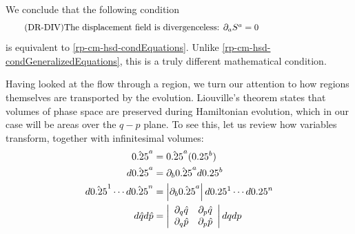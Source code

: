 We conclude that the following condition
\begin{equation}\label{rp-cm-hsd-condDivergenceDisplacement}
	\tag{DR-DIV}
	\eqtext{The displacement field is divergenceless: $\partial_a S^a = 0$} 
\end{equation}
is equivalent to \ref{rp-cm-hsd-condEquations}. Unlike \ref{rp-cm-hsd-condGeneralizedEquations}, this is a truly different mathematical condition.

Having looked at the flow through a region, we turn our attention to how regions themselves are transported by the evolution. Liouville's theorem states that volumes of phase space are preserved during Hamiltonian evolution, which in our case will be areas over the $q-p$ plane. To see this, let us review how variables transform, together with infinitesimal volumes:
\begin{equation}\label{rp-cm-volumeTransformation1d}
	\begin{aligned}
		\hat{\xi}^a &= \hat{\xi}^a(\xi^b) \\
		d\hat{\xi}^a &= \partial_b \hat{\xi}^a d\xi^b \\
		d\hat{\xi}^1 \cdots d\hat{\xi}^n &= \left| \partial_b \hat{\xi}^a \right| d\xi^1 \cdots d\xi^n \\
		d\hat{q} d\hat{p} &= \left|\begin{array}{ c c }
			\partial_q \hat{q} & \partial_p \hat{q} \\
			\partial_q \hat{p} & \partial_p \hat{p} \\
		\end{array} \right| dq dp \\
	\end{aligned}	
\end{equation}

